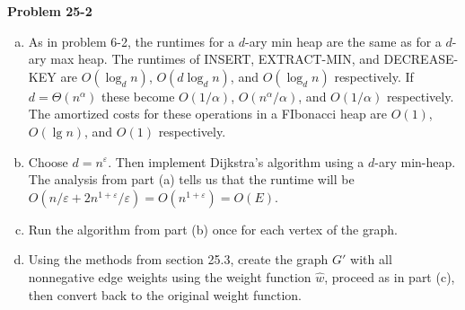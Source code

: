 \documentclass{article}
\begin{document}
\noindent\textbf{Problem 25-2}\\

\begin{enumerate}[a.]
\item  As in problem 6-2, the runtimes for a $d$-ary min heap are the same as for a $d$-ary max heap.  The runtimes of INSERT, EXTRACT-MIN, and DECREASE-KEY are $O(\log_d n)$, $O(d\log_d n)$, and $O(\log_d n)$ respectively.  If $d = \Theta(n^{\alpha})$ these become $O(1/\alpha)$, $O(n^\alpha / \alpha)$, and $O(1/\alpha)$ respectively.  The amortized costs for these operations in a FIbonacci heap are $O(1)$, $O(\lg n)$, and $O(1)$ respectively.

\item Choose $d = n^\varepsilon$.  Then implement Dijkstra's algorithm using a $d$-ary min-heap.  The analysis from part (a) tells us that the runtime will be $O(n/\varepsilon + 2n^{1 + \varepsilon}/\varepsilon) = O(n^{1 + \varepsilon}) = O(E)$.

\item Run the algorithm from part (b) once for each vertex of the graph. 

\item Using the methods from section 25.3, create the graph $G'$ with all nonnegative edge weights using the weight function $\hat{w}$, proceed as in part (c), then convert back to the original weight function. 
\end{enumerate}
\end{document}
